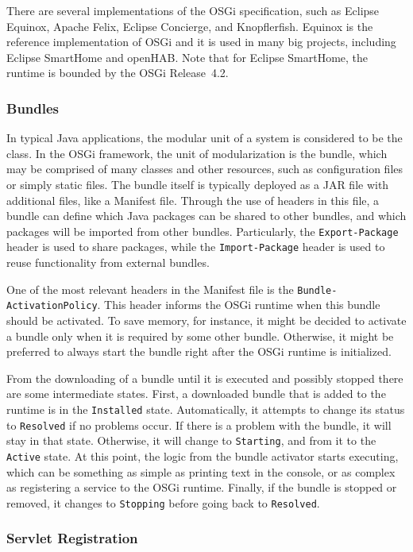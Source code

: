 \documentclass[12pt]{article}
\begin{document}
There are several implementations of the OSGi specification, such as Eclipse Equinox, Apache Felix, Eclipse Concierge, and Knopflerfish. Equinox is the reference implementation of OSGi and it is used in many big projects, including Eclipse SmartHome and openHAB. Note that for Eclipse SmartHome, the runtime is bounded by the OSGi Release~4.2. 

\subsubsection{Bundles}

In typical Java applications, the modular unit of a system is considered to be the class. In the OSGi framework, the unit of modularization is the bundle, which may be comprised of many classes and other resources, such as configuration files or simply static files. The bundle itself is typically deployed as a JAR file with additional files, like a Manifest file. Through the use of headers in this file, a bundle can define which Java packages can be shared to other bundles, and which packages will be imported from other bundles. Particularly, the \texttt{Export-Package} header is used to share packages, while the \texttt{Import-Package} header is used to reuse functionality from external bundles.

One of the most relevant headers in the Manifest file is the \texttt{Bundle-ActivationPolicy}. This header informs the OSGi runtime when this bundle should be activated. To save memory, for instance, it might be decided to activate a bundle only when it is required by some other bundle. Otherwise, it might be preferred to always start the bundle right after the OSGi runtime is initialized. 

From the downloading of a bundle until it is executed and possibly stopped there are some intermediate states. First, a downloaded bundle that is added to the runtime is in the \texttt{Installed} state. Automatically, it attempts to change its status to \texttt{Resolved} if no problems occur. If there is a problem with the bundle, it will stay in that state. Otherwise, it will change to \texttt{Starting}, and from it to the \texttt{Active} state. At this point, the logic from the bundle activator starts executing, which can be something as simple as printing text in the console, or as complex as registering a service to the OSGi runtime. Finally, if the bundle is stopped or removed, it changes to \texttt{Stopping} before going back to \texttt{Resolved}.

\subsubsection{Servlet Registration}
\end{document}
